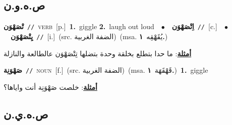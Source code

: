 \documentclass[10pt,a4paper,twoside]{article} %
\begin{document}
\begin{multicols}{2}
\vspace{-3mm}
\subsection*{\color{blue}\foreignlanguage{arabic}{ص.ه.و.ن}\color{blue}{}} 

{\setlength\topsep{0pt}\textbf{\foreignlanguage{arabic}{تْصَهْوَن}}\ {\color{gray}\texttt{//}\color{black}}\ \textsc{verb}\ [p.]\ \textbf{1.}~giggle  \textbf{2.}~laugh out loud\ \ $\bullet$\ \ \setlength\topsep{0pt}\textbf{\foreignlanguage{arabic}{اِتْصَهْوَن}}\ {\color{gray}\texttt{//}\color{black}}\ [c.]\ \ $\bullet$\ \ \setlength\topsep{0pt}\textbf{\foreignlanguage{arabic}{يِتْصَهْوَن}}\ {\color{gray}\texttt{//}\color{black}}\ [i.]\ (src. \color{gray}\foreignlanguage{arabic}{الضفة الغربية}\color{black})\ \color{gray}(msa. \foreignlanguage{arabic}{يُقَهْقِه}~\foreignlanguage{arabic}{\textbf{١.}})\color{black}\  \begin{flushright}\color{gray}\foreignlanguage{arabic}{\textbf{\underline{\foreignlanguage{arabic}{أمثلة}}}: ما حدا بتطلع بخلقة وحدة بتضلها تِتْصَهْوَن عالطالعة والنازلة}\end{flushright}\color{black}} \vspace{2mm}

{\setlength\topsep{0pt}\textbf{\foreignlanguage{arabic}{صَهْوَنِة}}\ {\color{gray}\texttt{//}\color{black}}\ \textsc{noun}\ [f.]\ (src. \color{gray}\foreignlanguage{arabic}{الضفة الغربية}\color{black})\ \color{gray}(msa. \foreignlanguage{arabic}{قَهْقَهَة}~\foreignlanguage{arabic}{\textbf{١.}})\color{black}\ \textbf{1.}~giggle\  \begin{flushright}\color{gray}\foreignlanguage{arabic}{\textbf{\underline{\foreignlanguage{arabic}{أمثلة}}}: خلصت صَهْوَنِة أنت واياها؟}\end{flushright}\color{black}} \vspace{2mm}

\vspace{-3mm}
\subsection*{\color{blue}\foreignlanguage{arabic}{ص.ه.ي.ن}\color{blue}{}} 


\end{multicols}
\end{document}
